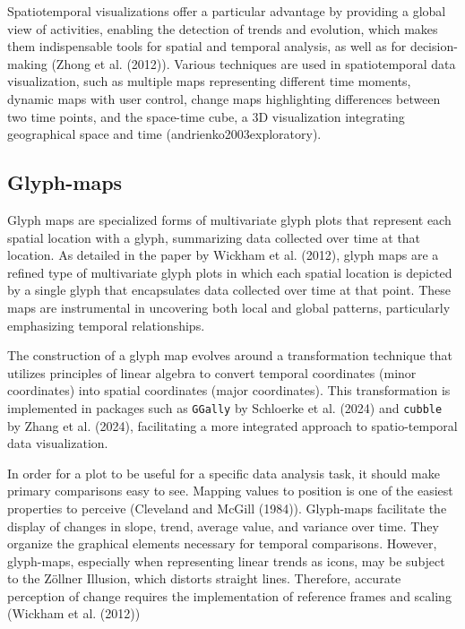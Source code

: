 Spatiotemporal visualizations offer a particular advantage by providing a global view of activities, enabling the detection of trends and evolution, which makes them indispensable tools for spatial and temporal analysis, as well as for decision-making (Zhong et al. (2012)). Various techniques are used in spatiotemporal data visualization, such as multiple maps representing different time moments, dynamic maps with user control, change maps highlighting differences between two time points, and the space-time cube, a 3D visualization integrating geographical space and time (andrienko2003exploratory).

\hypertarget{glyph-maps}{%
\subsection{Glyph-maps}\label{glyph-maps}}

Glyph maps are specialized forms of multivariate glyph plots that represent each spatial location with a glyph, summarizing data collected over time at that location. As detailed in the paper by Wickham et al. (2012), glyph maps are a refined type of multivariate glyph plots in which each spatial location is depicted by a single glyph that encapsulates data collected over time at that point. These maps are instrumental in uncovering both local and global patterns, particularly emphasizing temporal relationships.

The construction of a glyph map evolves around a transformation technique that utilizes principles of linear algebra to convert temporal coordinates (minor coordinates) into spatial coordinates (major coordinates). This transformation is implemented in packages such as \texttt{GGally} by Schloerke et al. (2024) and \texttt{cubble} by Zhang et al. (2024), facilitating a more integrated approach to spatio-temporal data visualization.

In order for a plot to be useful for a specific data analysis task, it should make primary comparisons easy to see. Mapping values to position is one of the easiest properties to perceive (Cleveland and McGill (1984)). Glyph-maps facilitate the display of changes in slope, trend, average value, and variance over time. They organize the graphical elements necessary for temporal comparisons. However, glyph-maps, especially when representing linear trends as icons, may be subject to the Zöllner Illusion, which distorts straight lines. Therefore, accurate perception of change requires the implementation of reference frames and scaling (Wickham et al. (2012))

